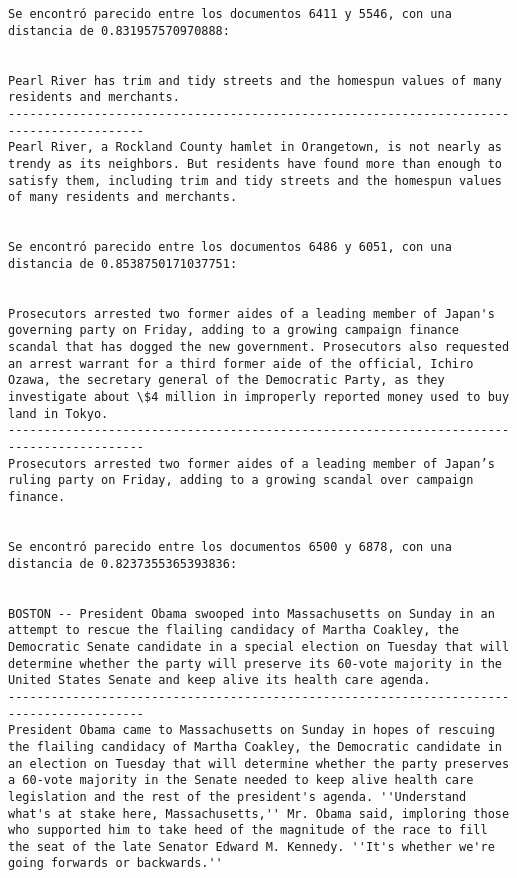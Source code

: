 \documentclass[11pt]{article}
\begin{document}
\begin{Verbatim}[commandchars=\\\{\}]
Se encontró parecido entre los documentos 6411 y 5546, con una distancia de 0.831957570970888:


Pearl River has trim and tidy streets and the homespun values of many residents and merchants.
-----------------------------------------------------------------------------------------
Pearl River, a Rockland County hamlet in Orangetown, is not nearly as trendy as its neighbors. But residents have found more than enough to satisfy them, including trim and tidy streets and the homespun values of many residents and merchants.


Se encontró parecido entre los documentos 6486 y 6051, con una distancia de 0.8538750171037751:


Prosecutors arrested two former aides of a leading member of Japan's governing party on Friday, adding to a growing campaign finance scandal that has dogged the new government. Prosecutors also requested an arrest warrant for a third former aide of the official, Ichiro Ozawa, the secretary general of the Democratic Party, as they investigate about \$4 million in improperly reported money used to buy land in Tokyo.
-----------------------------------------------------------------------------------------
Prosecutors arrested two former aides of a leading member of Japan’s ruling party on Friday, adding to a growing scandal over campaign finance.


Se encontró parecido entre los documentos 6500 y 6878, con una distancia de 0.8237355365393836:


BOSTON -- President Obama swooped into Massachusetts on Sunday in an attempt to rescue the flailing candidacy of Martha Coakley, the Democratic Senate candidate in a special election on Tuesday that will determine whether the party will preserve its 60-vote majority in the United States Senate and keep alive its health care agenda.
-----------------------------------------------------------------------------------------
President Obama came to Massachusetts on Sunday in hopes of rescuing the flailing candidacy of Martha Coakley, the Democratic candidate in an election on Tuesday that will determine whether the party preserves a 60-vote majority in the Senate needed to keep alive health care legislation and the rest of the president's agenda. ''Understand what's at stake here, Massachusetts,'' Mr. Obama said, imploring those who supported him to take heed of the magnitude of the race to fill the seat of the late Senator Edward M. Kennedy. ''It's whether we're going forwards or backwards.''



\end{Verbatim}
\end{document}
